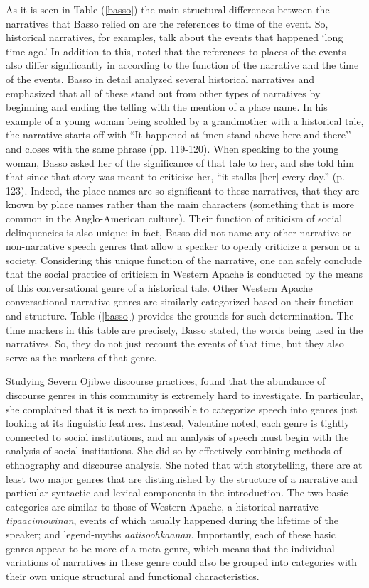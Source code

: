 \documentclass[12pt, draft]{article}
\begin{document}
As it is seen in Table (\ref{basso}) the main structural differences between the narratives that Basso relied on are the references to time of the event. So, historical narratives, for examples, talk about the events that happened `long time ago.' In addition to this, \textcite{basso1990} noted that the references to places of the events also differ significantly in according to the function of the narrative and the time of the events. Basso in detail analyzed several historical narratives and emphasized that all of these stand out from other types of narratives by beginning and ending the telling with the mention of a place name. In his example of a young woman being scolded by a grandmother with a historical tale, the narrative starts off with ``It happened at `men stand above here and there'' and closes with the same phrase (pp. 119-120). When speaking to the young woman, Basso asked her of the significance of that tale to her, and she told him that since that story was meant to criticize her, ``it stalks [her] every day.'' (p. 123). Indeed, the place names are so significant to these narratives, that they are known by place names rather than the main characters (something that is more common in the Anglo-American culture). Their function of criticism of social delinquencies is also unique: in fact, Basso did not name any other narrative or non-narrative speech genres that allow a speaker to openly criticize a person or a society. Considering this unique function of the narrative, one can safely conclude that the social practice of criticism in Western Apache is conducted by the means of this conversational genre of a historical tale. Other Western Apache conversational narrative genres are similarly categorized based on their function and structure. Table (\ref{basso}) provides the grounds for such determination. The time markers in this table are precisely, Basso stated, the words being used in the narratives. So, they do not just recount the events of that time, but they also serve as the markers of that genre. 

Studying Severn Ojibwe discourse practices, \textcite{valentine1995} found that the abundance of discourse genres in this community is extremely hard to investigate. In particular, she complained that it is next to impossible to categorize speech into genres just looking at its linguistic features. Instead, Valentine noted, each genre is tightly connected to  social institutions, and an analysis of speech must begin with the analysis of social institutions. She did so by effectively combining methods of ethnography and discourse analysis. She noted that with storytelling, there are at least two major genres that are distinguished by the structure of a narrative and particular syntactic and lexical components in the introduction. The two basic categories are similar to those of Western Apache, a historical narrative \textit{tipaacimowinan}, events of which usually happened during the lifetime of the speaker; and legend-myths \textit{aatisoohkaanan}. Importantly, each of these basic genres appear to be more of a meta-genre, which means that the individual variations of narratives in these genre could also be grouped into categories with their own unique structural and functional characteristics.
\end{document}
